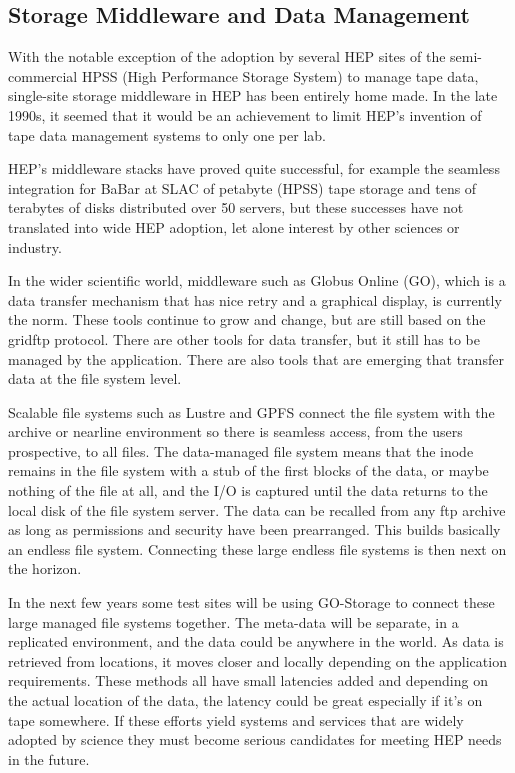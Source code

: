 \subsection{Storage Middleware and Data Management}
With the notable exception of the adoption by several HEP sites of the 
semi-commercial HPSS (High Performance Storage System)\cite{HPSS:url} to manage tape data, 
single-site storage middleware in HEP has been entirely home made.  In the 
late 1990s, it seemed that it would be an achievement to limit HEP’s invention 
of tape data management systems to only one per lab.

HEP's middleware stacks have proved quite successful, for example the seamless 
integration for BaBar at SLAC of petabyte (HPSS) tape storage and tens of terabytes 
of disks distributed over 50 servers, but these successes have not translated into 
wide HEP adoption, let alone interest by other sciences or industry. 

In the wider scientific world, middleware such as Globus Online (GO)\cite{GlobusOnline:url}, which is 
a data transfer mechanism that has nice retry and a graphical display, is 
currently the norm.  These tools continue to grow and change, but are still 
based on the gridftp protocol.  There are other tools for data transfer, but 
it still has to be managed by the application.   There are  also tools that
are emerging that transfer data at the file system level.  

Scalable file systems such as Lustre\cite{Lustre:url} and GPFS\cite{GPFS:url} connect 
the file system with the archive or nearline environment so there is seamless
access, from the users prospective, to all files.  The data-managed file 
system means that the inode remains in the file system with a stub of the first 
blocks of the data, or maybe nothing of the file at all, and the I/O is captured 
until the data returns to the local disk of the file system server.   
The data can be recalled from any ftp archive as long as permissions and 
security have been prearranged.   This builds basically an endless file system.   
Connecting these large endless file systems is then next on the horizon.  

In the next few years some test sites will be using GO-Storage 
to connect these large managed file systems together. The meta-data will be 
separate, in a replicated environment, and the data could be anywhere in the 
world.  As data is retrieved from locations, it moves closer and locally 
depending on the application requirements.   These methods all have small 
latencies added and depending on the actual location of the data, the latency could 
be great especially if it’s on tape somewhere.   If these efforts yield systems and services 
that are widely adopted by science they must become serious candidates for 
meeting HEP needs in the future.

